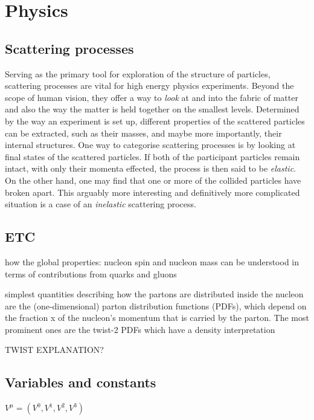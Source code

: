 \chapter{Physics}\label{cha:physics} %


\section{Scattering processes}

Serving as the primary tool for exploration of the structure of particles, scattering processes are vital for high energy physics experiments. Beyond the scope of human vision, they offer a way to \emph{look} at and into the fabric of matter and also the way the matter is held together on the smallest levels. Determined by the way an experiment is set up, different properties of the scattered particles can be extracted, such as their masses, and maybe more importantly, their internal structures. One way to categorise scattering processes is by looking at final states of the scattered particles. If both of the participant particles remain intact, with only their momenta effected, the process is then said to be \emph{elastic}. On the other hand, one may find that one or more of the collided particles have broken apart. This arguably more interesting and definitively more complicated situation is a case of an \emph{inelastic} scattering process. 


\section{ETC}

how the global properties: nucleon spin and nucleon mass can be understood in terms of contributions from quarks and gluons

simplest quantities describing how the partons are distributed inside the nucleon are the (one-dimensional) parton distribution functions (PDFs), which depend on the fraction x of the nucleon’s momentum that is carried by the parton. The most prominent ones are the twist-2 PDFs which have a density interpretation

TWIST EXPLANATION?



\section{Variables and constants}

$V^{\mu} = (V^0, V^1, V^2, V^3)$


